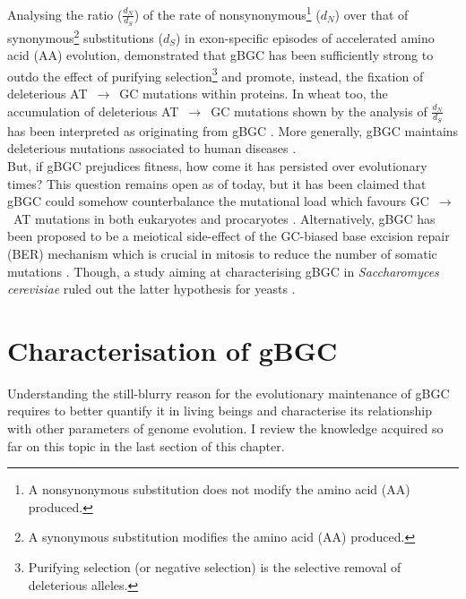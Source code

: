 Analysing the ratio ($\frac{d_N}{d_S}$) of the rate of nonsynonymous\footnote{A nonsynonymous substitution does not modify the amino acid (AA) produced.} ($d_N$) over that of synonymous\footnote{A synonymous substitution modifies the amino acid (AA) produced.} substitutions ($d_S$) in exon-specific episodes of accelerated amino acid (AA) evolution, \citet{galtier2009gcbiased} demonstrated that gBGC has been sufficiently strong to outdo the effect of purifying selection\footnote{Purifying selection (or negative selection) is the selective removal of deleterious alleles.} and promote, instead, the fixation of deleterious AT~$\rightarrow$~GC mutations within proteins.
In wheat too, the accumulation of deleterious AT~$\rightarrow$~GC mutations shown by the analysis of $\frac{d_N}{d_S}$ has been interpreted as originating from gBGC \citep{haudry2008mating}.
More generally, gBGC maintains deleterious mutations associated to human diseases \citep{necsulea2011meiotic,capra2013modelbased,lachance2014biased,xue2016basebiased}.\\


But, if gBGC prejudices fitness, how come it has persisted over evolutionary times?
This question remains open as of today, but it has been claimed that gBGC could somehow counterbalance the mutational load \citep{bengtsson1986biased,marais2003biased,glemin2010surprising,arbeithuber2015crossovers} which favours GC~$\rightarrow$~AT mutations in both eukaryotes \citep{lynch2010rate} and procaryotes \citep{hershberg2009general}.
Alternatively, gBGC has been proposed to be a meiotical side-effect of the GC-biased base excision repair (BER) mechanism which is crucial in mitosis to reduce the number of somatic mutations \citep{marais2003sex,lesecque2014conversion}.
Though, a study aiming at characterising gBGC in \textit{Saccharomyces cerevisiae} ruled out the latter hypothesis for yeasts \citep{lesecque2014biased}.








\section{Characterisation of gBGC}

Understanding the still-blurry reason for the evolutionary maintenance of gBGC requires to better quantify it in living beings and characterise its relationship with other parameters of genome evolution. 
I review the knowledge acquired so far on this topic in the last section of this chapter.



